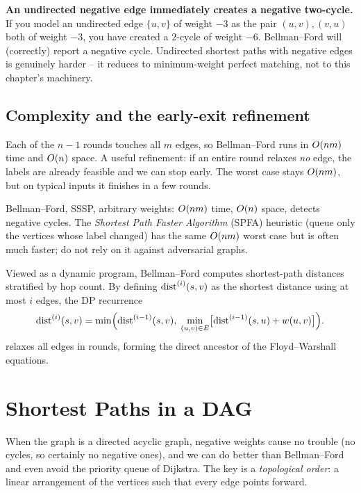 \begin{trapbox}
\textbf{An undirected negative edge immediately creates a negative two-cycle.} If you model an
undirected edge $\{u,v\}$ of weight $-3$ as the pair $(u,v),(v,u)$ both of weight $-3$,
you have created a $2$-cycle of weight $-6$. Bellman--Ford will (correctly) report a
negative cycle. Undirected shortest paths with negative edges is genuinely harder -- it
reduces to minimum-weight perfect matching, not to this chapter's machinery.
\end{trapbox}

\subsection{Complexity and the early-exit refinement}

Each of the $n-1$ rounds touches all $m$ edges, so Bellman--Ford runs in $O(nm)$ time and
$O(n)$ space. A useful refinement: if an entire round relaxes \emph{no} edge, the labels
are already feasible and we can stop early. The worst case stays $O(nm)$, but on typical
inputs it finishes in a few rounds.

\begin{complexitybox}
Bellman--Ford, SSSP, arbitrary weights: $O(nm)$ time, $O(n)$ space, detects negative
cycles. The \emph{Shortest Path Faster Algorithm} (SPFA) heuristic (queue only the vertices whose label changed) has the same
$O(nm)$ worst case but is often much faster; do not rely on it against adversarial graphs.
\end{complexitybox}

Viewed as a dynamic program, Bellman--Ford computes shortest-path distances stratified by hop count. By defining
$\operatorname{dist}^{(i)}(s,v)$ as the shortest distance using at most $i$ edges, the DP recurrence
\[
  \operatorname{dist}^{(i)}(s,v)=\min\Bigl(\operatorname{dist}^{(i-1)}(s,v),\;
     \min_{(u,v)\in E}\bigl[\operatorname{dist}^{(i-1)}(s,u)+w(u,v)\bigr]\Bigr).
\]
relaxes all edges in rounds, forming the direct ancestor of the Floyd--Warshall equations.

\section{Shortest Paths in a DAG}
\label{ch07:dag}

When the graph is a directed acyclic graph, negative weights cause no trouble (no cycles, so
certainly no negative ones), and we can do better than Bellman--Ford and even avoid the
priority queue of Dijkstra. The key is a \emph{topological order}: a linear arrangement of
the vertices such that every edge points forward.

